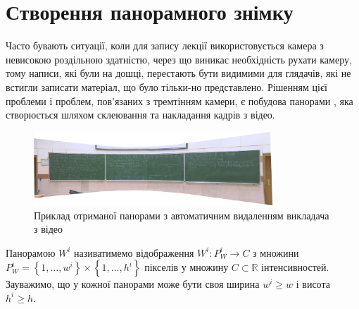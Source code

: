 \section{Створення панорамного знімку}


Часто бувають ситуації, коли для запису лекції використовується камера з
невисокою роздільною здатністю, через що виникає необхідність рухати
камеру, тому написи, які були на дошці, перестають бути видимими для
глядачів, які не встигли записати матеріал, що було тільки-но
представлено. Рішенням цієї проблеми і проблем, пов'язаних з тремтінням
камери, є побудова панорами , яка створюється шляхом склеювання
та накладання кадрів з відео.

\begin{figure}[H]
    \centering
    \includegraphics[width=0.8\textwidth]{images/panorama_example}
    \caption{Приклад отриманої панорами з автоматичним видаленням
    викладача з відео
    \label{fig:panorama_example}
    }
\end{figure}

Панорамою \(W^{i}\) називатимемо відображення
\(W^{i}:P_{W}^{i} \rightarrow C\) з множини
\(P_{W}^{i} = \left\{ 1,\ldots,w^{i} \right\} \times \left\{ 1,\ldots,h^{i} \right\}\)
пікселів у множину \(C\mathbb{\subset R}\) інтенсивностей. Зауважимо, що
у кожної панорами може бути своя ширина \(w^{i} \geq w\) і висота
\(h^{i} \geq h\).





